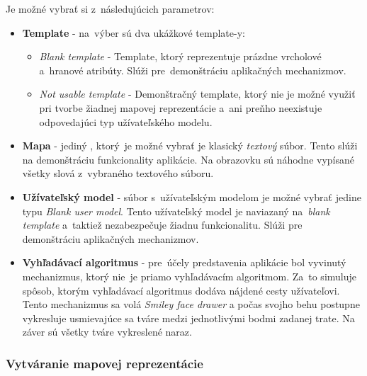 \documentclass[12pt,a4paper]{report}
\begin{document}
Je možné vybrať si z~následujúcich parametrov:
\begin{itemize}
    \item \textbf{Template} - na~výber sú dva ukážkové template-y:
    \begin{itemize}
        \item \textit{Blank template} - Template, ktorý reprezentuje prázdne vrcholové a~hranové atribúty. Slúži pre~demonštráciu aplikačných mechanizmov.
        \item \textit{Not usable template} - Demonštračný template, ktorý nie je možné využiť pri tvorbe žiadnej mapovej reprezentácie a~ani preňho neexistuje odpovedajúci typ užívateľského modelu.
    \end{itemize}
    \item \textbf{Mapa} - jediný , ktorý~je možné vybrať je klasický \textit{textový} súbor. Tento  slúži na demonštráciu funkcionality aplikácie. Na obrazovku sú náhodne vypísané všetky slová z~vybraného textového súboru.
    \item \textbf{Užívateľský model} - súbor s~užívateľským modelom je možné vybrať jedine typu \textit{Blank user model}. Tento užívateľský model je naviazaný na~\textit{blank template} a~taktiež nezabezpečuje žiadnu funkcionalitu. Slúži pre demonštráciu aplikačných mechanizmov.
    \item \textbf{Vyhľadávací algoritmus} - pre~účely predstavenia aplikácie bol vyvinutý mechanizmus, ktorý nie~je priamo vyhľadávacím algoritmom. Za~to simuluje spôsob, ktorým vyhľadávací algoritmus dodáva nájdené cesty užívateľovi. Tento mechanizmus sa volá \textit{Smiley face drawer} a počas svojho behu postupne vykresluje usmievajúce sa tváre medzi jednotlivými bodmi zadanej trate. Na záver sú všetky tváre vykreslené naraz. 
\end{itemize}

\subsubsection{Vytváranie mapovej reprezentácie}

\begin{figure}[h]\centering
{}
\end{figure}
\end{document}
